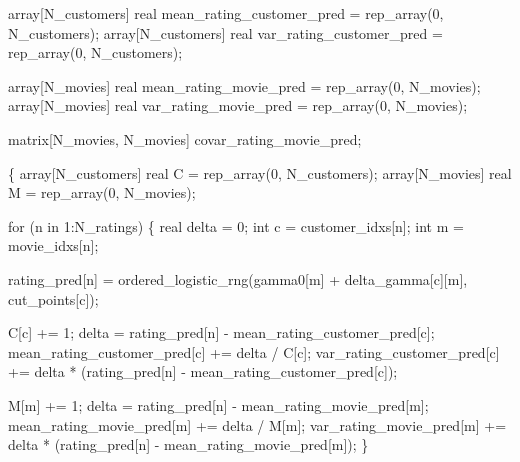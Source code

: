 \documentclass[
  letterpaper,
  DIV=11,
  numbers=noendperiod]{scrartcl}
\newenvironment{Shaded}{\begin{snugshade}}{\end{snugshade}}
\newcommand{\ControlFlowTok}[1]{\textcolor[rgb]{0.00,0.23,0.31}{#1}}
\newcommand{\DataTypeTok}[1]{\textcolor[rgb]{0.68,0.00,0.00}{#1}}
\newcommand{\DecValTok}[1]{\textcolor[rgb]{0.68,0.00,0.00}{#1}}
\newcommand{\NormalTok}[1]{\textcolor[rgb]{0.00,0.23,0.31}{#1}}
\begin{document}
\begin{codelisting}
\begin{Shaded}
\begin{Highlighting}[]
  \DataTypeTok{array}\NormalTok{[N\_customers] }\DataTypeTok{real}\NormalTok{ mean\_rating\_customer\_pred}
\NormalTok{    = rep\_array(}\DecValTok{0}\NormalTok{, N\_customers);}
  \DataTypeTok{array}\NormalTok{[N\_customers] }\DataTypeTok{real}\NormalTok{ var\_rating\_customer\_pred}
\NormalTok{    = rep\_array(}\DecValTok{0}\NormalTok{, N\_customers);}

  \DataTypeTok{array}\NormalTok{[N\_movies] }\DataTypeTok{real}\NormalTok{ mean\_rating\_movie\_pred = rep\_array(}\DecValTok{0}\NormalTok{, N\_movies);}
  \DataTypeTok{array}\NormalTok{[N\_movies] }\DataTypeTok{real}\NormalTok{ var\_rating\_movie\_pred = rep\_array(}\DecValTok{0}\NormalTok{, N\_movies);}

  \DataTypeTok{matrix}\NormalTok{[N\_movies, N\_movies] covar\_rating\_movie\_pred;}

\NormalTok{  \{}
    \DataTypeTok{array}\NormalTok{[N\_customers] }\DataTypeTok{real}\NormalTok{ C = rep\_array(}\DecValTok{0}\NormalTok{, N\_customers);}
    \DataTypeTok{array}\NormalTok{[N\_movies] }\DataTypeTok{real}\NormalTok{ M = rep\_array(}\DecValTok{0}\NormalTok{, N\_movies);}

    \ControlFlowTok{for}\NormalTok{ (n }\ControlFlowTok{in} \DecValTok{1}\NormalTok{:N\_ratings) \{}
      \DataTypeTok{real}\NormalTok{ delta = }\DecValTok{0}\NormalTok{;}
      \DataTypeTok{int}\NormalTok{ c = customer\_idxs[n];}
      \DataTypeTok{int}\NormalTok{ m = movie\_idxs[n];}

\NormalTok{      rating\_pred[n]}
\NormalTok{        = ordered\_logistic\_rng(gamma0[m] + delta\_gamma[c][m],}
\NormalTok{                               cut\_points[c]);}

\NormalTok{      C[c] += }\DecValTok{1}\NormalTok{;}
\NormalTok{      delta = rating\_pred[n] {-} mean\_rating\_customer\_pred[c];}
\NormalTok{      mean\_rating\_customer\_pred[c] += delta / C[c];}
\NormalTok{      var\_rating\_customer\_pred[c]}
\NormalTok{        += delta * (rating\_pred[n] {-} mean\_rating\_customer\_pred[c]);}

\NormalTok{      M[m] += }\DecValTok{1}\NormalTok{;}
\NormalTok{      delta = rating\_pred[n] {-} mean\_rating\_movie\_pred[m];}
\NormalTok{      mean\_rating\_movie\_pred[m] += delta / M[m];}
\NormalTok{      var\_rating\_movie\_pred[m]}
\NormalTok{        += delta * (rating\_pred[n] {-} mean\_rating\_movie\_pred[m]);}
\NormalTok{    \}}


\end{Highlighting}
\end{Shaded}
\end{codelisting}
\end{document}
